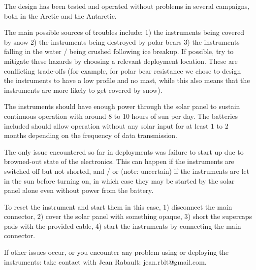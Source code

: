 \documentclass[pdftex,a4paper,12pt,twocolumn,fleqn,captions=tableheading]{scrartcl}
\begin{document}
The design has been tested and operated without problems in several campaigns, both in the Arctic and the Antarctic.

The main possible sources of troubles include: 1) the instruments being covered by snow 2) the instruments being destroyed by polar bears 3) the instruments falling in the water / being crushed following ice breakup. If possible, try to mitigate these hazards by choosing a relevant deployment location. These are conflicting trade-offs (for example, for polar bear resistance we chose to design the instruments to have a low profile and no mast, while this also means that the instruments are more likely to get covered by snow).

The instruments should have enough power through the solar panel to sustain continuous operation with around 8 to 10 hours of sun per day. The batteries included should allow operation without any solar input for at least 1 to 2 months depending on the frequency of data transmission.

The only issue encountered so far in deployments was failure to start up due to browned-out state of the electronics. This can happen if the instruments are switched off but not shorted, and / or (note: uncertain) if the instruments are let in the sun before turning on, in which case they may be started by the solar panel alone even without power from the battery.

To reset the instrument and start them in this case, 1) disconnect the main connector, 2) cover the solar panel with something opaque, 3) short the supercaps pads with the provided cable, 4) start the instruments by connecting the main connector.

If other issues occur, or you encounter any problem using or deploying the instruments: take contact with Jean Rabault: jean.rblt@gmail.com.
\end{document}
